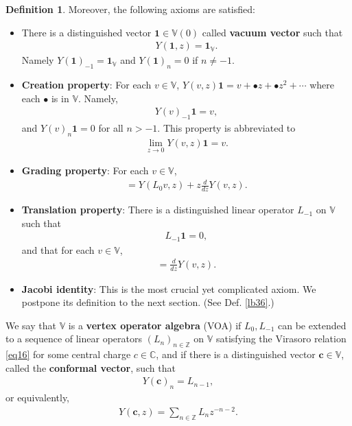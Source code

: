 \documentclass[12pt,a4paper,notitlepage]{article}
\theoremstyle{definition}
\newtheorem{df}{Definition}[section]
\theoremstyle{plain}
\newcommand{\id}{\mathbf{1}}
\newcommand{\blt}{\bullet}
\newcommand{\Vbb}{\mathbb V}
\newcommand{\Cbb}{\mathbb C}
\newcommand{\Zbb}{\mathbb Z}
\newcommand{\cbf}{\mathbf c}
\numberwithin{equation}{section}
\begin{document}
\begin{df}
Moreover, the following axioms are satisfied:
\begin{itemize}
\item There is a distinguished vector $\id\in\Vbb(0)$ called \textbf{vacuum vector} such that
\begin{align*}
	Y(\id,z)=\id_\Vbb.
\end{align*}
Namely $Y(\id)_{-1}=\id_\Vbb$ and $Y(\id)_n=0$ if $n\neq -1$.
\item \textbf{Creation property}: For each $v\in\Vbb$, $Y(v,z)\id=v+\blt z+\blt z^2+\cdots$ where each $\blt$ is in $\Vbb$. Namely,
\begin{align}
Y(v)_{-1}\id =v,	
\end{align}
and $Y(v)_{n}\id=0$ for all $n>-1$. This property is abbreviated to
\begin{align*}
\lim_{z\rightarrow0}Y(v,z)\id=v.	
\end{align*}
\item \textbf{Grading property}: For each $v\in\Vbb$,
\begin{align}
[L_0,Y(v,z)]=Y(L_0v,z)+z\frac d{dz}Y(v,z).	\label{eq19}
\end{align}
\item \textbf{Translation property}: There is a distinguished linear operator $L_{-1}$ on $\Vbb$  such that 
\begin{align}
L_{-1}\id=0,	
\end{align}
and that for each $v\in\Vbb$,
\begin{align}
[L_{-1},Y(v,z)]=\frac d{dz}Y(v,z).
\end{align}
\item \textbf{Jacobi identity}: This is the most crucial yet complicated axiom. We postpone its definition to the next section. (See Def. \ref{lb36}.)
\end{itemize}

We say that $\Vbb$ is a \textbf{vertex operator algebra} (VOA) if $L_0,L_{-1}$ can be extended to a sequence of linear operators $(L_n)_{n\in\Zbb}$ on $\Vbb$ satisfying the Virasoro relation \eqref{eq16} for some central charge $c\in\Cbb$, and if there is a distinguished vector $\cbf\in\Vbb$, called the \textbf{conformal vector}, such that
\begin{align}
Y(\cbf)_n=L_{n-1},\label{eq22}
\end{align}
or equivalently,
\begin{align}
Y(\cbf,z)=\sum_{n\in\Zbb} L_nz^{-n-2}.	
\end{align}
\hfill\qedsymbol
\end{df}
\end{document}
